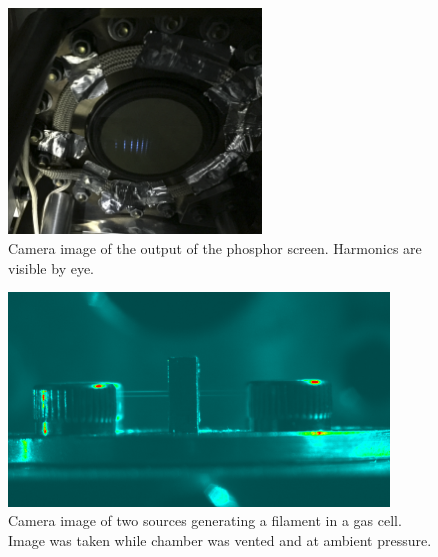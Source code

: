 \begin{figure}
	\centering
	\includegraphics[width=0.6\textwidth]{figures/Two_source/MCP_ts_harmonics.png}
	\caption[Image of phosphor output of high harmonics generated from two sources]{Camera image of the output of the phosphor screen.  Harmonics are visible by eye.}
	\label{MCP_ts_harmonics}
\end{figure}

\begin{figure}
	\centering
	\includegraphics[width=0.9\textwidth]{figures/Two_source/ts_filament_gas_cell.png}
	\caption[Camera image of filaments generated by two sources passing through a gas cell]{Camera image of two sources generating a filament in a gas cell. Image was taken while chamber was vented and at ambient pressure.}
	\label{ts_filament}
\end{figure}

